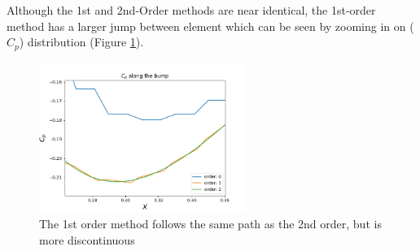 \documentclass{article}
\begin{document}
Although the 1st and 2nd-Order methods are near identical, the 1st-order method has a larger jump between element which
can be seen by zooming in on ($C_p$) distribution (Figure \ref{fig:cp_zoom}).

\begin{figure}[H]
	\centering
	\includegraphics[width=0.60\textwidth,keepaspectratio]{cp_zoom.png}
	\caption{The 1st order method follows the same path as the 2nd order, but is more discontinuous}
	\label{fig:cp_zoom}
\end{figure}
\end{document}
